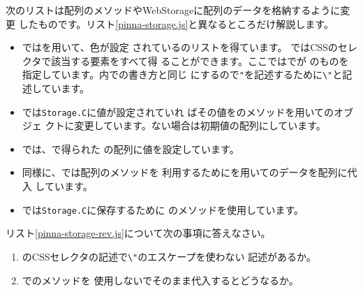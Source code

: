 次のリストは配列のメソッドやWebStorageに配列のデータを格納するように変更
したものです。リスト\ref{pinna-storage.js}と異なるところだけ解説します。
\begin{itemize}
 \item {}ではを用いて、色が設定
       されているのリストを得ています。
       ではCSSのセレクタで該当する要素をすべて得
       ることができます。ここではでが
       のものを指定しています。\HTML 内での書き方と同じ
       にするので\Verb+"+を記述するために\Verb+\"+と記述しています。%
 \item {}では\Verb+Storage.C+に値が設定されていれ
       ばその値をのメソッドを用いて\JS のオブジェ
       クトに変更しています。ない場合は初期値の配列にしています。
 \item {}では、で得られた
       の配列に値を設定しています。
 \item 同様に、では配列のメソッドを
       利用するためにを用いてのデータを配列に代入
       しています。
 \item {}では\Verb+Storage.C+に保存するために
       のメソッドを使用しています。
\end{itemize}
\begin{Problem}
 \upshape
 リスト\ref{pinna-storage-rev.js}について次の事項に答えなさい。
 \begin{enumerate}
  \item {}のCSSセレクタの記述で\Verb+\"+のエスケープを使わない
        記述があるか。
  \item {}でのメソッドを
        使用しないでそのまま代入するとどうなるか。
 \end{enumerate}
\end{Problem}